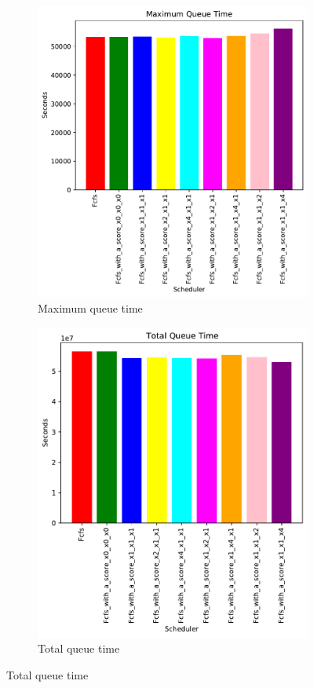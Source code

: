 \documentclass[a4paper]{article}
\begin{document}
	\begin{figure}[H]\centering
	\begin{subfigure}[b]{0.4\linewidth}\centering\includegraphics[width=1\linewidth]{MBSS/plot/FCFS_Score_2022-03-26->2022-03-26_Maximum_queue_time_95_128_4_256_1_1024.pdf}\caption{Maximum queue time}\end{subfigure}
	\begin{subfigure}[b]{0.4\linewidth}\centering\includegraphics[width=1\linewidth]{MBSS/plot/FCFS_Score_2022-03-26->2022-03-26_Total_queue_time_95_128_4_256_1_1024.pdf}\caption{Total queue time}\end{subfigure}

\end{figure}
\end{document}
